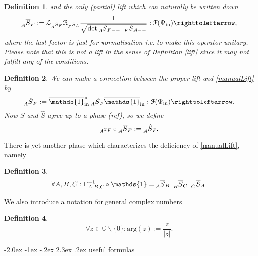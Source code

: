 \documentclass[oneside,reqno,12pt]{amsart}
\makeatletter
\newtheorem{Def}{Definition}[section]
\renewcommand\section{\@startsection {section}{1}{\z@}%
                                   {-2.0ex \@plus -1ex \@minus -.2ex}%
                                   {2.3ex \@plus.2ex}%
                                   {\normalfont\Large\bfseries}}
\makeatother
\begin{document}
\begin{Def}
and the only (partial) lift which can naturally be written down
\begin{equation}\label{manualLift}
\prescript{}{A}{\overline{S}}_{F}:=\mathcal{L}_{\prescript{}{A}{S}_{F}}\mathcal{R}_{\prescript{}{F}{S}_{A}} 
\frac{1}{\sqrt{\det \prescript{}{A}{S}_{F --} ~\prescript{}{F}{S}_{A --}}}:\mathcal{F}(\Psi_{\text{in}})\righttoleftarrow,
\end{equation}
where the last factor is just for normalisation i.e. to make this operator unitary. Please note that this is not a lift in the sense of Definition \ref{lift} since it may not fulfill any of the conditions.
\end{Def}

\begin{Def}
We can make a connection between the proper lift and \eqref{manualLift} by
\begin{equation}
\prescript{}{A}{\hat{S}}_F:= \overline{\mathds{1}}_{\text{in}}^* \prescript{}{A}{\tilde{S}}_{F} \overline{\mathds{1}}_{\text{in}}:\mathcal{F}(\Psi_{\text{in}})\righttoleftarrow.
\end{equation}
Now \(\overline{S}\) and \(\hat{S}\) agree up to a phase (ref), so we define
\begin{equation}\label{def:z}
\prescript{}{A}{z}_{F} \circ \prescript{}{A}{\overline{S}}_{F} := \prescript{}{A}{\hat{S}}_{F}.
\end{equation} 
\end{Def}
There is yet another phase which characterizes the deficiency of \eqref{manualLift}, namely
\begin{Def}
\begin{equation}\label{def:gamma}
\forall A,B,C: \Gamma^{-1}_{A,B,C} \circ \mathds{1} = \prescript{}{A}{\overline{S}}_B ~ \prescript{}{B}{\overline{S}}_C ~ \prescript{}{C}{\overline{S}}_A.
\end{equation}
\end{Def}

We also introduce a notation for  general complex numbers
\begin{Def}
\begin{equation}
\forall z\in\mathbb{C}\backslash \{0\}: \text{arg}(z) := \frac{z}{|z|}.
\end{equation}
\end{Def}
\section{useful formulas}
\end{document}
